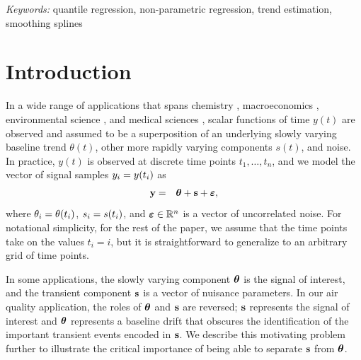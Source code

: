 \documentclass[12pt]{article}
\newcommand{\Real}{\mathbb{R}}
\newcommand{\V}[1]{{\bm{\mathbf{\MakeLowercase{#1}}}}} %
\newcommand{\VE}[2]{\MakeLowercase{#1}_{#2}} %
\begin{document}
	\noindent%
	{\it Keywords:} quantile regression, non-parametric regression, trend estimation, smoothing splines
	\vfill

	\newpage

\section{Introduction}
\label{sec:intro}

In a wide range of applications that spans chemistry \citep{Ning2014}, macroeconomics \citep{yamada2017estimating}, environmental science \citep{brantley2014mobile}, and medical sciences \citep{pettersson2013algorithm, marandi2015qualitative}, scalar functions of time $y(t)$ are observed and assumed to be a superposition of an underlying slowly varying baseline trend $\theta(t)$, other more rapidly varying components $s(t)$, and noise. In practice, $y(t)$ is observed at discrete time points $t_1, \ldots, t_n$, and we model the vector of signal samples $\VE{y}{i} = y(t_i)$ as
\begin{eqnarray*}
\V{y} & = & \V{\theta} + \V{s} + \V{\varepsilon},
\end{eqnarray*}
where $\VE{\theta}{i} = \theta(t_i)$, $\VE{s}{i} = s(t_i)$, and $\V{\varepsilon} \in \Real^n$ is a vector of uncorrelated noise. For notational simplicity, for the rest of the paper, we assume that the time points take on the values $t_i = i$, but it is straightforward to generalize to an arbitrary grid of time points.

In some applications, the slowly varying component $\V{\theta}$ is the signal of interest, and the transient component $\V{s}$ is a vector of nuisance parameters. In our air quality application, the roles of $\V{\theta}$ and $\V{s}$ are reversed; $\V{s}$ represents the signal of interest and $\V{\theta}$ represents a baseline drift that obscures the identification of the important transient events encoded in $\V{s}$. We describe this motivating problem further to illustrate the critical importance of being able to separate $\V{s}$ from $\V{\theta}$.
\end{document}
